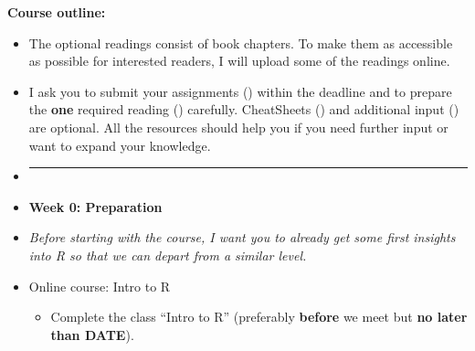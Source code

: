 \documentclass[12pt, a4paper]{article}
\begin{document}
\newpage

\noindent\textbf{Course outline:}  
\begin{itemize}
\item[] The optional readings consist of book chapters. To make them as accessible as possible for interested readers, I will upload some of the readings online.
\item[] I ask you to submit your assignments (\faExclamation) within the deadline and to prepare the \textbf{one} required reading (\faBook) carefully. CheatSheets (\faLightbulbO) and additional input (\faEdit) are optional. All the resources should help you if you need further input or want to expand your knowledge. 
\item[]


\vspace*{0.04in}
\noindent\rule{16cm}{0.7pt}
\vspace*{-0.45in}
\item[] \textbf{Week 0: Preparation}
\item[] \textit{Before starting with the course, I want you to already get some first insights into \textsf{R} so that we can depart from a similar level.}
\item[] \faExclamation \space 
\space Online course: Intro to \textsf{R}
\begin{itemize}   
\item[$\square$] Complete the class ``Intro to \textsf{R}'' (preferably \textbf{before} we meet but\textbf{ no later than DATE}).
\end{itemize}


\end{itemize}
\end{document}
